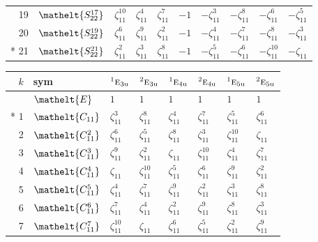 \documentclass[10pt,a4paper]{article}
\numberwithin{equation}{section}
\newcommand{\eltfont}[1]{{\let\sigma\eltsigma\mathelt{#1}}}
\newcommand{\irr}[1]{\text{\normalfont\scshape #1}}
\newcommand{\conjpair}[1]{{}^{#1}}
\newcommand{\cls}[1]{\eltfont{#1}}
\newcommand{\ptag}[1]{\mathrm{#1}}
\newcommand{\rootunity}[1]{\zeta_{#1}}
\begin{document}
{\begin{longtable}{@{}rlllllllll@{}}
19 & $\cls{S_{22}^{17}}$ & $\rootunity{11}^{10}$ & $\rootunity{11}^{4}$ & $\rootunity{11}^{7}$ & $-1$ & $-\rootunity{11}^{3}$ & $-\rootunity{11}^{8}$ & $-\rootunity{11}^{6}$ & $-\rootunity{11}^{5}$\\
20 & $\cls{S_{22}^{19}}$ & $\rootunity{11}^{6}$ & $\rootunity{11}^{9}$ & $\rootunity{11}^{2}$ & $-1$ & $-\rootunity{11}^{4}$ & $-\rootunity{11}^{7}$ & $-\rootunity{11}^{8}$ & $-\rootunity{11}^{3}$\\*
21 & $\cls{S_{22}^{21}}$ & $\rootunity{11}^{2}$ & $\rootunity{11}^{3}$ & $\rootunity{11}^{8}$ & $-1$ & $-\rootunity{11}^{5}$ & $-\rootunity{11}^{6}$ & $-\rootunity{11}^{10}$ & $-\rootunity{11}$\\
\bottomrule\end{longtable}}
{\small\setlength{\tabcolsep}{4pt}
\begin{longtable}{@{}rlllllll@{}}\toprule
$k$ & sym & $\conjpair{1}\irr{e}_{3\ptag{u}}$ & $\conjpair{2}\irr{e}_{3\ptag{u}}$ & $\conjpair{1}\irr{e}_{4\ptag{u}}$ & $\conjpair{2}\irr{e}_{4\ptag{u}}$ & $\conjpair{1}\irr{e}_{5\ptag{u}}$ & $\conjpair{2}\irr{e}_{5\ptag{u}}$\\\midrule\endhead
\bottomrule\endfoot\endlastfoot
0 & $\cls{E}$ & $1$ & $1$ & $1$ & $1$ & $1$ & $1$\\*
1 & $\cls{C_{11}}$ & $\rootunity{11}^{3}$ & $\rootunity{11}^{8}$ & $\rootunity{11}^{4}$ & $\rootunity{11}^{7}$ & $\rootunity{11}^{5}$ & $\rootunity{11}^{6}$\\
2 & $\cls{C_{11}^{2}}$ & $\rootunity{11}^{6}$ & $\rootunity{11}^{5}$ & $\rootunity{11}^{8}$ & $\rootunity{11}^{3}$ & $\rootunity{11}^{10}$ & $\rootunity{11}$\\
3 & $\cls{C_{11}^{3}}$ & $\rootunity{11}^{9}$ & $\rootunity{11}^{2}$ & $\rootunity{11}$ & $\rootunity{11}^{10}$ & $\rootunity{11}^{4}$ & $\rootunity{11}^{7}$\\
4 & $\cls{C_{11}^{4}}$ & $\rootunity{11}$ & $\rootunity{11}^{10}$ & $\rootunity{11}^{5}$ & $\rootunity{11}^{6}$ & $\rootunity{11}^{9}$ & $\rootunity{11}^{2}$\\
5 & $\cls{C_{11}^{5}}$ & $\rootunity{11}^{4}$ & $\rootunity{11}^{7}$ & $\rootunity{11}^{9}$ & $\rootunity{11}^{2}$ & $\rootunity{11}^{3}$ & $\rootunity{11}^{8}$\\
6 & $\cls{C_{11}^{6}}$ & $\rootunity{11}^{7}$ & $\rootunity{11}^{4}$ & $\rootunity{11}^{2}$ & $\rootunity{11}^{9}$ & $\rootunity{11}^{8}$ & $\rootunity{11}^{3}$\\
7 & $\cls{C_{11}^{7}}$ & $\rootunity{11}^{10}$ & $\rootunity{11}$ & $\rootunity{11}^{6}$ & $\rootunity{11}^{5}$ & $\rootunity{11}^{2}$ & $\rootunity{11}^{9}$\\

\end{longtable}}
\end{document}
